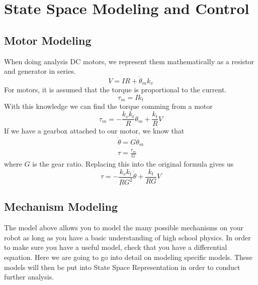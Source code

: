\documentclass[../main.tex]{subfiles}
\begin{document}
    \section{State Space Modeling and Control}

    \subsection{Motor Modeling}
    When doing analysis DC motors, we represent them mathematically as a resistor
    and generator in series.
    \begin{equation*}
        V = IR + \dot \theta_m k_v
    \end{equation*}
    For motors, it is assumed that the torque is proportional to the current.
    \begin{equation*}
        \tau_m = I k_t
    \end{equation*}
    With this knowledge we can find the torque comming from a motor
    \begin{equation*}
        \tau_m = -\frac{k_v k_t}{R} \dot \theta_m + \frac{k_t}{R} V
    \end{equation*}
    If we have a gearbox attached to our motor, we know that 
    \begin{align*}
        \dot \theta = G \dot \theta_m \\
        \tau = \frac{\tau_m}{G}
    \end{align*}
    where $G$ is the gear ratio. 
    Replacing this into the original formula gives us 
    \begin{equation*}
        \tau = -\frac{k_v k_t}{RG^2} \dot \theta + \frac{k_t}{RG} V
    \end{equation*}

    \subsection{Mechanism Modeling}
    The model above allows you to model the many possible mechanisms on your robot as long as you 
    have a basic understanding of high school physics. In order to make sure you have a useful 
    model, check that you have a differential equation. Here we are going to go into detail on modeling 
    specific models. These models will then be put into State Space Representation in order to conduct 
    further analysis.
\end{document}
